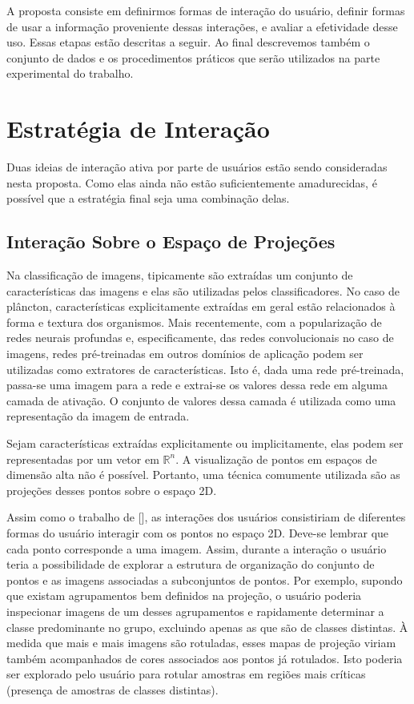 A proposta consiste em definirmos formas de interação do usuário, definir formas de usar a informação proveniente dessas interações, e avaliar a efetividade desse uso. Essas etapas estão descritas a seguir. Ao final descrevemos também o conjunto de dados e os procedimentos práticos que serão utilizados na parte experimental do trabalho. 



\section{Estratégia de Interação}
\label{sec:estategia_interacao}

Duas ideias de interação ativa por parte de usuários estão  sendo consideradas nesta proposta. Como elas ainda não estão suficientemente amadurecidas, é possível que a estratégia final seja uma combinação delas.

\subsection{Interação Sobre o Espaço de Projeções}
\label{sec:espaco_projecoes}

Na classificação de imagens, tipicamente são extraídas um conjunto de características das imagens e elas são utilizadas pelos classificadores. No caso de plâncton, características explicitamente extraídas em geral estão relacionados à forma e textura dos organismos. Mais recentemente, com a popularização de redes neurais profundas e, especificamente, das redes convolucionais no caso de imagens, redes pré-treinadas em outros domínios de aplicação podem ser utilizadas como extratores de características. Isto é, dada uma rede pré-treinada, passa-se uma imagem para a rede e extrai-se os valores dessa rede em alguma camada de ativação. O conjunto de valores dessa camada é utilizada como uma representação da imagem de entrada.

Sejam características extraídas explicitamente ou implicitamente, elas podem ser representadas por um vetor em $\mathbb{R}^n$. A visualização de pontos em espaços de dimensão alta não é possível. Portanto, uma técnica comumente utilizada são as projeções desses pontos sobre o espaço 2D.  

Assim como o trabalho de [\cite{bernard2018comparing}], as interações dos usuários consistiriam de diferentes formas do usuário interagir com os pontos no espaço 2D.  Deve-se lembrar que cada ponto corresponde a uma imagem. Assim, durante a interação o usuário teria a possibilidade de explorar a estrutura de organização do conjunto de pontos e as imagens associadas a subconjuntos de pontos. Por exemplo, supondo que existam agrupamentos bem definidos na projeção, o usuário poderia inspecionar imagens de um desses agrupamentos e rapidamente determinar a classe predominante no grupo, excluindo apenas as que são de classes distintas. À medida que mais e mais imagens são rotuladas, esses mapas de projeção viriam também acompanhados de cores associados aos pontos já rotulados. Isto poderia ser explorado pelo usuário para rotular amostras em regiões mais críticas (presença de amostras de classes distintas).




